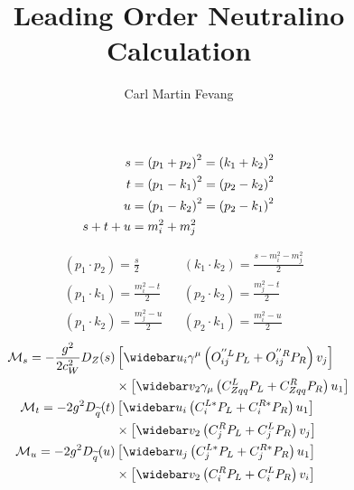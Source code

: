 \documentclass[english,notitlepage]{article}
\title{Leading Order Neutralino Calculation}
\author{Carl Martin Fevang}
\begin{document}
\maketitle


\begin{figure} [ht!]
    \centering
\end{figure}

\begin{subequations}
    \begin{align}
        s         & = \left(p_1 + p_2\right)^2 = \left(k_1 + k_2\right)^2 \\
        t         & = \left(p_1-k_1\right)^2 = \left(p_2-k_2\right)^2     \\
        u         & = \left(p_1-k_2\right)^2 = \left(p_2-k_1\right)^2     \\
        s + t + u & = m_i^2 + m_j^2
    \end{align}
\end{subequations}

\begin{subequations}
    \begin{align}
         & (p_1 \cdot p_2) = \frac{s}{2}         &  & (k_1 \cdot k_2) = \frac{s-m_i^2-m_j^2}{2} \\
         & (p_1 \cdot k_1) = \frac{m_i^2 - t}{2} &  & (p_2 \cdot k_2) = \frac{m_j^2-t}{2}       \\
         & (p_1 \cdot k_2) = \frac{m_j^2 - u}{2} &  & (p_2 \cdot k_1) = \frac{m_i^2-u}{2}
    \end{align}
\end{subequations}
\begin{subequations}
    \begin{align} \nonumber
        \M_s = -\frac{g^2}{2c_W^2} D_Z(s) & \bclosed{ \wbar{u}_i\gamma^\mu\pclosed{O^{''L}_{ij}P_L + O^{''R}_{ij}P_R} v_j }    \\
                                          & \times \bclosed{ \wbar{v}_2 \gamma_\mu \pclosed{C^L_{Zqq}P_L + C^R_{Zqq}P_R} u_1 } \\ \nonumber
        \M_t = -2g^2 D_{\wtilde{q}}(t)    & \bclosed{ \wbar{u}_i \pclosed{C_{i}^{L*}P_L + C_{i}^{R*} P_R} u_1 }                \\
                                          & \times \bclosed{ \wbar{v}_2 \pclosed{C^R_{j}P_L + C^L_{j}P_R} v_j }                \\ \nonumber
        \M_u = -2g^2 D_{\wtilde{q}}(u)    & \bclosed{ \wbar{u}_j \pclosed{C_{j}^{L*}P_L + C_{j}^{R*} P_R} u_1 }                \\
                                          & \times \bclosed{ \wbar{v}_2 \pclosed{C^R_{i}P_L + C^L_{i}P_R} v_i }
    \end{align}
\end{subequations}
\end{document}
